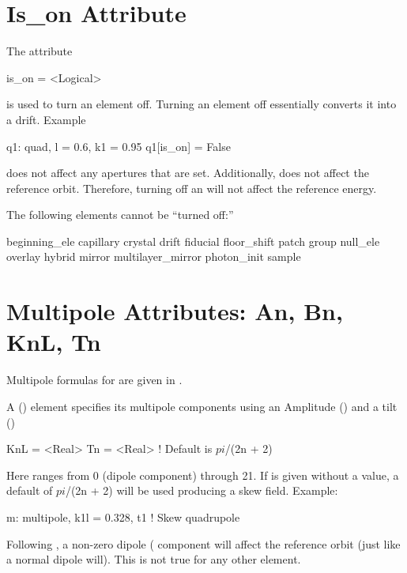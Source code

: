 \section{Is_on Attribute}
\label{s:is.on}

The  attribute
\begin{example}
  is_on = <Logical>
\end{example}
is used to turn an element off. Turning
an element off essentially converts it into a drift.
Example
\begin{example}
  q1: quad, l = 0.6, k1 = 0.95
  q1[is_on] = False
\end{example}

 does not affect any apertures that are set. Additionally,
 does not affect the reference orbit. Therefore, turning 
off an  will not affect the reference energy.

The following elements cannot be ``turned off:''
\begin{example}
  beginning_ele
  capillary
  crystal
  drift
  fiducial
  floor_shift
  patch
  group
  null_ele
  overlay
  hybrid
  mirror
  multilayer_mirror
  photon_init
  sample
\end{example}


\section{Multipole Attributes: An, Bn, KnL, Tn}
\label{s:multip}

Multipole formulas for are given in . 

A  () element specifies its multipole
components using an Amplitude () and a tilt ()
\begin{example}
  KnL = <Real>
  Tn  = <Real>  ! Default is $pi$/(2n + 2)
\end{example}
Here  ranges from 0 (dipole component) through 21.  If 
is given without a value, a default of $pi$/(2n + 2) will be used
producing a skew field. Example:
\begin{example}
  m: multipole, k1l = 0.328, t1  ! Skew quadrupole
\end{example}
Following , a non-zero dipole ( component will affect
the reference orbit (just like a normal dipole will). This is not true
for any other element.


